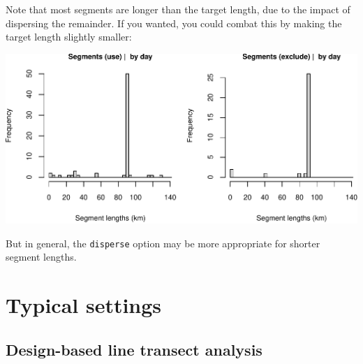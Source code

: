 \documentclass[
]{book}
\newenvironment{Shaded}{\begin{snugshade}}{\end{snugshade}}
\newcommand{\CommentTok}[1]{\textcolor[rgb]{0.56,0.35,0.01}{\textit{#1}}}
\newcommand{\DataTypeTok}[1]{\textcolor[rgb]{0.13,0.29,0.53}{#1}}
\newcommand{\DecValTok}[1]{\textcolor[rgb]{0.00,0.00,0.81}{#1}}
\newcommand{\KeywordTok}[1]{\textcolor[rgb]{0.13,0.29,0.53}{\textbf{#1}}}
\newcommand{\NormalTok}[1]{#1}
\newcommand{\OperatorTok}[1]{\textcolor[rgb]{0.81,0.36,0.00}{\textbf{#1}}}
\newcommand{\OtherTok}[1]{\textcolor[rgb]{0.56,0.35,0.01}{#1}}
\newcommand{\StringTok}[1]{\textcolor[rgb]{0.31,0.60,0.02}{#1}}
\begin{document}
Note that most segments are longer than the target length, due to the impact of dispersing the remainder. If you wanted, you could combat this by making the target length slightly smaller:

\begin{Shaded}
\end{Shaded}

\includegraphics{figures/unnamed-chunk-108-1.pdf}

But in general, the \texttt{disperse} option may be more appropriate for shorter segment lengths.

\hypertarget{typical-settings}{%
\section*{Typical settings}\label{typical-settings}}

\hypertarget{design-based-line-transect-analysis}{%
\subsection*{Design-based line transect analysis}\label{design-based-line-transect-analysis}}
\end{document}
